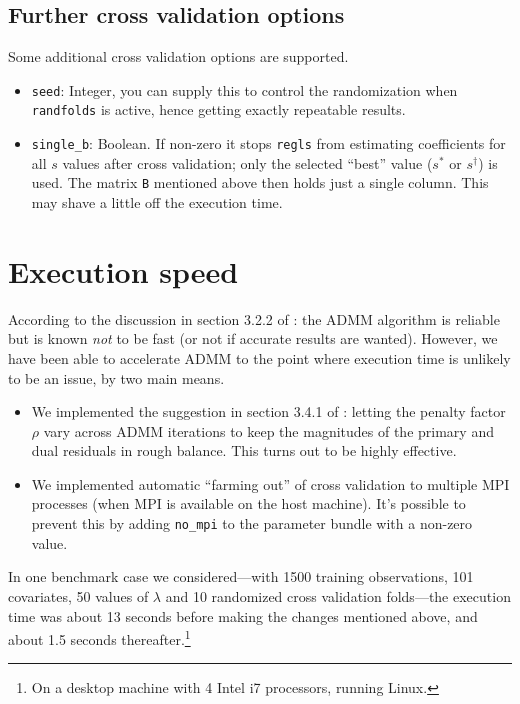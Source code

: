 \documentclass{article}
\begin{document}
\subsection*{Further cross validation options}

Some additional cross validation options are supported.

\begin{itemize}
\item \texttt{seed}: Integer, you can supply this to control the
  randomization when \texttt{randfolds} is active, hence getting
  exactly repeatable results.
\item \texttt{single\_b}: Boolean. If non-zero it stops \texttt{regls}
  from estimating coefficients for all $s$ values after cross
  validation; only the selected ``best'' value ($s^*$ or
  $s^{\dagger}$) is used. The matrix \texttt{B} mentioned above
  then holds just a single column. This may shave a little off the
  execution time.
\end{itemize}

\section{Execution speed}
\label{sec:speed}

According to the discussion in section 3.2.2 of \cite{boyd2010}: the
ADMM algorithm is reliable but is known \textit{not} to be fast (or
not if accurate results are wanted). However, we have been able to
accelerate ADMM to the point where execution time is unlikely to be an
issue, by two main means.
\begin{itemize}
\item We implemented the suggestion in section 3.4.1 of
  \cite{boyd2010}: letting the penalty factor $\rho$ vary across ADMM
  iterations to keep the magnitudes of the primary and dual residuals
  in rough balance. This turns out to be highly effective.
\item We implemented automatic ``farming out'' of cross validation to
  multiple \textsf{MPI} processes (when \textsf{MPI} is available on
  the host machine). It's possible to prevent this by adding
  \texttt{no\_mpi} to the parameter bundle with a non-zero value.
\end{itemize}
In one benchmark case we considered---with 1500 training observations,
101 covariates, 50 values of $\lambda$ and 10 randomized cross
validation folds---the execution time was about 13 seconds before
making the changes mentioned above, and about 1.5 seconds
thereafter.\footnote{On a desktop machine with 4 Intel i7 processors,
  running Linux.}
\end{document}
